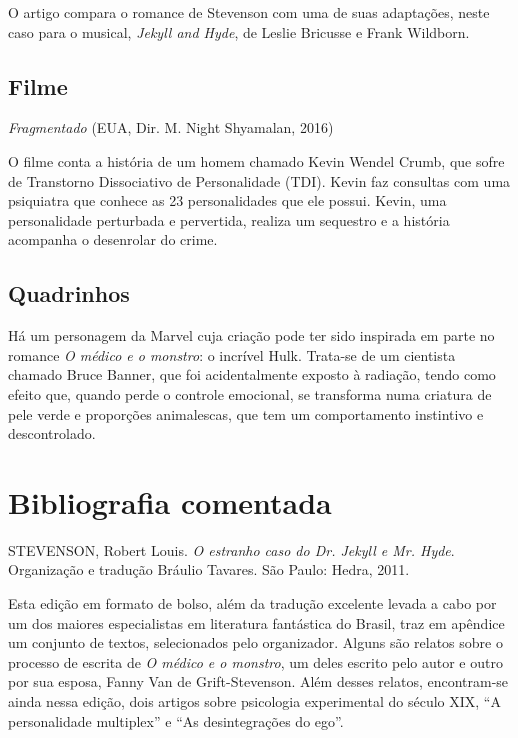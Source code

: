 \documentclass[12pt]{extarticle}
\begin{document}
O artigo compara o romance de Stevenson com uma de suas adaptações,
neste caso para o musical, \emph{Jekyll and Hyde}, de Leslie Bricusse e
Frank Wildborn.

\subsection{Filme}

\emph{Fragmentado} (EUA, Dir. M. Night Shyamalan, 2016)

O filme conta a história de um homem chamado Kevin Wendel Crumb, que
sofre de Transtorno Dissociativo de Personalidade (TDI). Kevin faz
consultas com uma psiquiatra que conhece as 23 personalidades que ele
possui. Kevin, uma personalidade perturbada e pervertida, realiza um
sequestro e a história acompanha o desenrolar do crime.

\subsection{Quadrinhos}

Há um personagem da Marvel cuja criação pode ter sido inspirada em parte
no romance \emph{O médico e o monstro}: o incrível Hulk. Trata-se de um
cientista chamado Bruce Banner, que foi acidentalmente exposto à
radiação, tendo como efeito que, quando perde o controle emocional, se
transforma numa criatura de pele verde e proporções animalescas, que tem
um comportamento instintivo e descontrolado.


\section{Bibliografia comentada}

STEVENSON, Robert Louis. \emph{O estranho caso do Dr. Jekyll e Mr.
Hyde}. Organização e tradução Bráulio Tavares. São Paulo: Hedra, 2011.

Esta edição em formato de bolso, além da tradução excelente levada a
cabo por um dos maiores especialistas em literatura fantástica do
Brasil, traz em apêndice um conjunto de textos, selecionados pelo
organizador. Alguns são relatos sobre o processo de escrita de \emph{O
médico e o monstro}, um deles escrito pelo autor e outro por sua esposa,
Fanny Van de Grift-Stevenson. Além desses relatos, encontram-se ainda
nessa edição, dois artigos sobre psicologia experimental do século XIX,
``A personalidade multiplex'' e ``As desintegrações do ego''.

%
\end{document}
